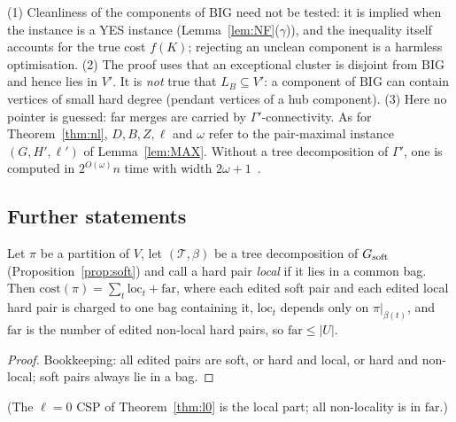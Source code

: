 \begin{remark}\label{rem:omegastate}
(1) Cleanliness of the components of $\mathrm{BIG}$ need not be tested: it is implied when the instance is a YES instance (Lemma~\ref{lem:NF}($\gamma$)), and the inequality itself accounts for the true cost $f(K)$; rejecting an unclean component is a harmless optimisation. (2) The proof uses that an exceptional cluster is disjoint from $\mathrm{BIG}$ and hence lies in $V'$. It is \emph{not} true that $L_B\subseteq V'$: a component of $\mathrm{BIG}$ can contain vertices of small hard degree (pendant vertices of a hub component). (3) Here no pointer is guessed: far merges are carried by $\Gamma'$-connectivity. As for Theorem~\ref{thm:nl}, $D,B,Z,\ell$ and $\omega$ refer to the pair-maximal instance $(G,H',\ell')$ of Lemma~\ref{lem:MAX}. Without a tree decomposition of $\Gamma'$, one is computed in $2^{O(\omega)}n$ time with width $2\omega+1$~\cite{Kor21}.
\end{remark}


\subsection{Further statements}
\begin{lemma}\label{lem:CPc}
Let $\pi$ be a partition of $V$, let $(\mathcal T,\beta)$ be a tree decomposition of $G_{\mathrm{soft}}$ (Proposition~\ref{prop:soft}) and call a hard pair \emph{local} if it lies in a common bag. Then $\mathrm{cost}(\pi)=\sum_{t}\mathrm{loc}_t+\mathrm{far}$, where each edited soft pair and each edited local hard pair is charged to one bag containing it, $\mathrm{loc}_t$ depends only on $\pi|_{\beta(t)}$, and $\mathrm{far}$ is the number of edited non-local hard pairs, so $\mathrm{far}\le|U|$.
\end{lemma}
\begin{proof}
Bookkeeping: all edited pairs are soft, or hard and local, or hard and non-local; soft pairs always lie in a bag.
\end{proof}
(The $\ell=0$ CSP of Theorem~\ref{thm:l0} is the local part; all non-locality is in $\mathrm{far}$.)

